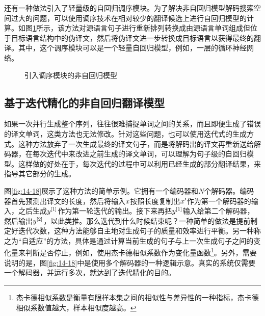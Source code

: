 \parinterval 还有一种做法引入了轻量级的自回归调序模块。为了解决非自回归模型解码搜索空间过大的问题，可以使用调序技术在相对较少的翻译候选上进行自回归模型的计算。如图\ref{fig:14-22}所示，该方法对源语言句子进行重新排列转换成由源语言单词组成但位于目标语言结构中的伪译文，然后将伪译文进一步转换成目标语言以获得最终的翻译。其中，这个调序模块可以是一个轻量自回归模型，例如，一层的循环神经网络。

\begin{figure}[htp]
\centering
 
\caption{引入调序模块的非自回归模型}
\label{fig:14-22}
\end{figure}


\subsection{基于迭代精化的非自回归翻译模型}

\parinterval 如果一次并行生成整个序列，往往很难捕捉单词之间的关系，而且即便生成了错误的译文单词，这类方法也无法修改。针对这些问题，也可以使用迭代式的生成方式。这种方法放弃了一次生成最终的译文句子，而是将解码出的译文再重新送给解码器，在每次迭代中来改进之前生成的译文单词，可以理解为句子级的自回归模型。这样做的好处在于，每次迭代的过程中可以利用已经生成的部分翻译结果，来指导其它部分的生成。

\parinterval 图\ref{fig:14-18}展示了这种方法的简单示例。它拥有一个编码器和$N$个解码器。编码器首先预测出译文的长度，然后将输入${x}$按照长度复制出${x'}$作为第一个解码器的输入，之后生成${y}^{[1]}$作为第一轮迭代的输出。接下来再把${y}^{[1]}$输入给第二个解码器，然后输出${y}^{[2]}$，以此类推。那么迭代到什么时候结束呢？一种简单的做法是提前制定好迭代次数，这种方法能够自主地对生成句子的质量和效率进行平衡。另一种称之为“自适应”的方法，具体是通过计算当前生成的句子与上一次生成句子之间的变化量来判断是否停止，例如，使用杰卡德相似系数作为变化量函数\footnote{杰卡德相似系数是衡量有限样本集之间的相似性与差异性的一种指标，杰卡德相似系数值越大，样本相似度越高。}。另外，需要说明的是，图\ref{fig:14-18}中是使用多个解码器的一种逻辑示意。真实的系统仅需要一个解码器，并运行多次，就达到了迭代精化的目的。

